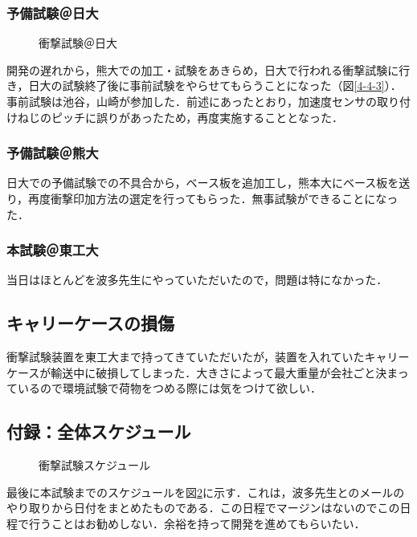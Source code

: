 \subsubsection{予備試験＠日大}
\begin{figure}[H]
	\centering
	\caption{衝撃試験＠日大}
	\label{fig4-4-3}
\end{figure}
開発の遅れから，熊大での加工・試験をあきらめ，日大で行われる衝撃試験に行き，日大の試験終了後に事前試験をやらせてもらうことになった（図\ref{4-4-3}）．事前試験は池谷，山崎が参加した．前述にあったとおり，加速度センサの取り付けねじのピッチに誤りがあったため，再度実施することとなった．
\subsubsection{予備試験＠熊大}
日大での予備試験での不具合から，ベース板を追加工し，熊本大にベース板を送り，再度衝撃印加方法の選定を行ってもらった．無事試験ができることになった．
\subsubsection{本試験＠東工大}
当日はほとんどを波多先生にやっていただいたので，問題は特になかった．
\subsection{キャリーケースの損傷}
衝撃試験装置を東工大まで持ってきていただいたが，装置を入れていたキャリーケースが輸送中に破損してしまった．大きさによって最大重量が会社ごと決まっているので環境試験で荷物をつめる際には気をつけて欲しい．
\subsection{付録：全体スケジュール}
\begin{figure}[H]
	\centering
	\caption{衝撃試験スケジュール}
	\label{fig4-4-4}
\end{figure}
最後に本試験までのスケジュールを図\ref{fig4-4-4}に示す．これは，波多先生とのメールのやり取りから日付をまとめたものである．この日程でマージンはないのでこの日程で行うことはお勧めしない．余裕を持って開発を進めてもらいたい．






